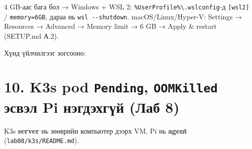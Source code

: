 \begin{Shaded}
\begin{Highlighting}[]
 \KeywordTok{|}  
\end{Highlighting}
\end{Shaded}

4 GB-аас бага бол → Windows + WSL 2: \texttt{\%UserProfile\%\textbackslash{}\allowbreak{}.\allowbreak{}wslconfig}-д \texttt{{[}wsl2{]}} / \texttt{memory=6GB}, дараа нь \texttt{wsl\ -\/\allowbreak{}-shutdown}. macOS/Linux/Hyper-V: Settings → Resources → Advanced → Memory limit → 6 GB → Apply \& restart (SETUP.md А.2).

Хүнд үйлчилгээг зогсооно:

\begin{Shaded}
\begin{Highlighting}[]
\end{Highlighting}
\end{Shaded}

\hypertarget{k3s-pod-pending-oomkilled-ux44dux441ux432ux44dux43b-pi-ux43dux44dux433ux434ux44dux445ux433ux4afux439-ux43bux430ux431-8}{%
\section{\texorpdfstring{10. K3s pod \texttt{Pending}, \texttt{OOMKilled} эсвэл Pi нэгдэхгүй (Лаб 8)}{10. K3s pod Pending, OOMKilled эсвэл Pi нэгдэхгүй (Лаб 8)}}\label{k3s-pod-pending-oomkilled-ux44dux441ux432ux44dux43b-pi-ux43dux44dux433ux434ux44dux445ux433ux4afux439-ux43bux430ux431-8}}

K3s \textbf{server} нь зөөврийн компьютер дээрх VM, Pi нь \textbf{agent} (\texttt{lab08/\allowbreak{}k3s/\allowbreak{}README.\allowbreak{}md}).

\begin{Shaded}
\begin{Highlighting}[]
\OperatorTok{\textless{}}\OperatorTok{\textgreater{}} \KeywordTok{|} 
\end{Highlighting}
\end{Shaded}

